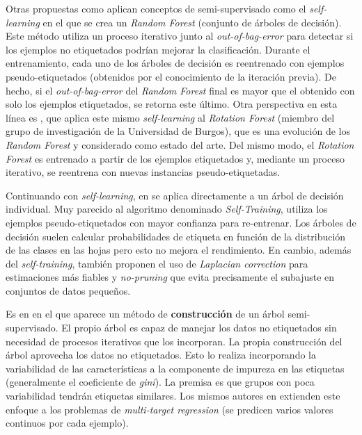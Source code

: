 Otras propuestas como \cite{leistner2009semi} aplican conceptos de semi-supervisado como el \textit{self-learning} en el que se crea un \textit{Random Forest} (conjunto de árboles de decisión). Este método utiliza un proceso iterativo junto al \textit{out-of-bag-error} para detectar si los ejemplos no etiquetados podrían mejorar la clasificación. Durante el entrenamiento, cada uno de los árboles de decisión es reentrenado con ejemplos pseudo-etiquetados (obtenidos por el conocimiento de la iteración previa). De hecho, si el \textit{out-of-bag-error} del \textit{Random Forest} final es mayor que el obtenido con solo los ejemplos etiquetados, se retorna este último. Otra perspectiva en esta línea es \cite{fazakis2017self}, que aplica este mismo \textit{self-learning} al \textit{Rotation Forest} \cite{rodriguez2006rotation} (miembro del grupo de investigación de la Universidad de Burgos), que es una evolución de los \textit{Random Forest} y considerado como estado del arte. Del mismo modo, el \textit{Rotation Forest} es entrenado a partir de los ejemplos etiquetados y, mediante un proceso iterativo, se reentrena con nuevas instancias pseudo-etiquetadas.

Continuando con \textit{self-learning}, en \cite{tanha2017semi} se aplica directamente a un árbol de decisión individual. Muy parecido al algoritmo denominado \textit{Self-Training}, utiliza los ejemplos pseudo-etiquetados con mayor confianza para re-entrenar. Los árboles de decisión suelen calcular probabilidades de etiqueta en función de la distribución de las clases en las hojas pero esto no mejora el rendimiento. En cambio, además del \textit{self-training}, también proponen el uso de \textit{Laplacian correction} para estimaciones más fiables y \textit{no-pruning} que evita precisamente el subajuste en conjuntos de datos pequeños.

Es en \cite{levatic2017semi} en el que aparece un método de \textbf{construcción} de un árbol semi-supervisado. El propio árbol es capaz de manejar los datos no etiquetados sin necesidad de procesos iterativos que los incorporan. La propia construcción del árbol aprovecha los datos no etiquetados. Esto lo realiza incorporando la variabilidad de las características a la componente de impureza en las etiquetas (generalmente el coeficiente de \textit{gini}). La premisa es que grupos con poca variabilidad tendrán etiquetas similares. Los mismos autores en \cite{levatic2018semi} extienden este enfoque a los problemas de \textit{multi-target regression} (se predicen varios valores continuos por cada ejemplo).


